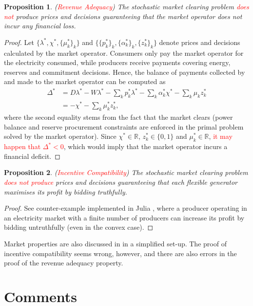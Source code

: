 \documentclass{article}
\newtheorem{proposition}{Proposition}
\begin{document}
\begin{proposition}
(\textcolor{red}{Revenue Adequacy}) The stochastic market clearing problem \textcolor{red}{does not} produce prices and decisions guaranteeing that the market operator does not incur any financial loss.
\end{proposition}
\begin{proof}
Let $\{\lambda^*, \chi^*, \{\mu_k^*\}_k\}$ and $\{\{p_k^*\}_k, \{\alpha_k^*\}_k, \{z_k^*\}_k\}$ denote prices and decisions calculated by the market operator. Consumers only pay the market operator for the electricity consumed, while producers receive payments covering energy, reserves and commitment decisions. Hence, the balance of payments collected by and made to the market operator can be computed as
\begin{align*}
\Delta^* &= D\lambda^* - W \lambda^* - \sum_k p_k^* \lambda^* - \sum_k \alpha_k^* \chi^* - \sum_k \mu_k z_k^*\\
&= -\chi^* - \sum_k \mu_k^* z_k^*,
\end{align*}
where the second equality stems from the fact that the market clears (power balance and reserve procurement constraints are enforced in the primal problem solved by the market operator). Since $\chi^* \in \mathbb{R}$, $z_k^* \in \{0, 1\}$ and $\mu_k^* \in \mathbb{R}$, \textcolor{red}{it may happen that $\Delta^* < 0$}, which would imply that the market operator incurs a financial deficit.
\end{proof}

\begin{proposition}
(\textcolor{red}{Incentive Compatibility}) The stochastic market clearing problem \textcolor{red}{does not produce} prices and decisions guaranteeing that each flexible generator maximises its profit by bidding truthfully.
\end{proposition}
\begin{proof}
See counter-example implemented in Julia \cite{SMER2022}, where a producer operating in an electricity market with a finite number of producers can increase its profit by bidding untruthfully (even in the convex case).
\end{proof}

Market properties are also discussed in \cite{Ratha2019} in a simplified set-up. The proof of incentive compatibility seems wrong, however, and there are also errors in the proof of the revenue adequacy property.

\section{Comments}
\end{document}
